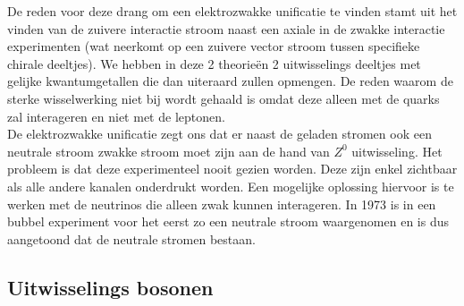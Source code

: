 \documentclass[../main.tex]{subfiles}
\begin{document}
De reden voor deze drang om een elektrozwakke unificatie te vinden stamt uit het vinden van de zuivere interactie stroom naast een axiale in de zwakke interactie experimenten (wat neerkomt op een zuivere vector stroom tussen specifieke chirale deeltjes). We hebben in deze 2 theorieën 2 uitwisselings deeltjes met gelijke kwantumgetallen die dan uiteraard zullen opmengen. De reden waarom de sterke wisselwerking niet bij wordt gehaald is omdat deze alleen met de quarks zal interageren en niet met de leptonen.\\
De elektrozwakke unificatie zegt ons dat er naast de geladen stromen ook een neutrale stroom zwakke stroom moet zijn  aan de hand van $Z^0$ uitwisseling. Het probleem is dat deze experimenteel nooit gezien worden. Deze zijn enkel zichtbaar als alle andere kanalen onderdrukt worden. Een mogelijke oplossing hiervoor is te werken met de neutrinos die alleen zwak kunnen interageren. In 1973 is in een bubbel experiment voor het eerst zo een neutrale stroom waargenomen en is dus aangetoond dat de neutrale stromen bestaan.

\subsection{Uitwisselings bosonen}%
\label{sub:uitwisselings_bosonen}
\end{document}
